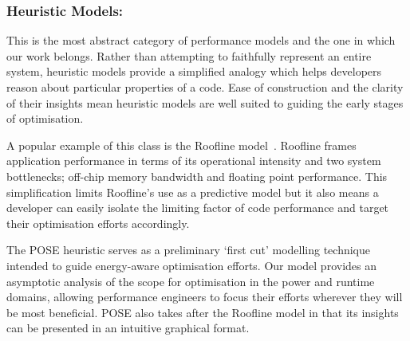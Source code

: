 \subsubsection{Heuristic Models:}
This is the most abstract category of performance models and the one in which our work belongs.
Rather than attempting to faithfully represent an entire system, heuristic models provide a simplified analogy which helps developers reason about particular properties of a code.
Ease of construction and the clarity of their insights mean heuristic models are well suited to guiding the early stages of optimisation.

A popular example of this class is the Roofline model~\cite{williams:2009aa}.
Roofline frames application performance in terms of its operational intensity and two system bottlenecks; off-chip memory bandwidth and floating point performance.
This simplification limits Roofline's use as a predictive model but it also means a developer can easily isolate the limiting factor of code performance and target their optimisation efforts accordingly.

The POSE heuristic serves as a preliminary `first cut' modelling technique intended to guide energy-aware optimisation efforts.
Our model provides an asymptotic analysis of the scope for optimisation in the power and runtime domains, allowing performance engineers to focus their efforts wherever they will be most beneficial.
POSE also takes after the Roofline model in that its insights can be presented in an intuitive graphical format.
